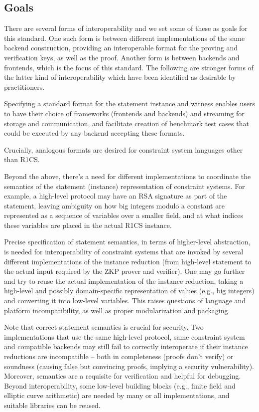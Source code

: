 \documentclass[a4paper,12pt]{article}
\begin{document}
\subsection{Goals} 
\label{goals}

There are several forms of interoperability and we set some of these as goals for this standard. One such form is between different implementations of the same backend construction, providing an interoperable format for the proving and verification keys, as well as the proof. Another form is between backends and frontends, which is the focus of this standard. The following are stronger forms of the latter kind of interoperability which have been identified as desirable by practitioners.

Specifying a standard format for the statement instance and witness enables users to have their choice of frameworks (frontends and backends) and streaming for storage and communication, and facilitate creation of benchmark test cases that could be executed by any backend accepting these formats.
 
Crucially, analogous formats are desired for constraint system languages other than R1CS.


Beyond the above, there’s a need for different implementations to coordinate the semantics of the statement (instance) representation of constraint systems. For example, a high-level protocol may have an RSA signature as part of the statement, leaving ambiguity on how big integers modulo a constant are represented as a sequence of variables over a smaller field, and at what indices these variables are placed in the actual R1CS instance.

Precise specification of statement semantics, in terms of higher-level abstraction, is needed for interoperability of constraint systems that are invoked by several different implementations of the instance reduction (from high-level statement to the actual input required by the ZKP prover and verifier). One may go further and try to reuse the actual implementation of the instance reduction, taking a high-level and possibly domain-specific representation of values (e.g., big  integers) and converting it into low-level variables. This raises questions of language and platform incompatibility, as well as proper modularization and packaging.

Note that correct statement semantics is crucial for security. Two implementations that use the same high-level protocol, same constraint system and compatible backends may still fail to correctly interoperate if their instance reductions are incompatible -- both in completeness (proofs don’t verify) or soundness (causing false but convincing proofs, implying a security vulnerability). Moreover, semantics are a requisite for verification and helpful for debugging. Beyond interoperability, some low-level building blocks (e.g., finite field and elliptic curve arithmetic) are needed by many or all implementations, and suitable libraries can be reused.
\end{document}
